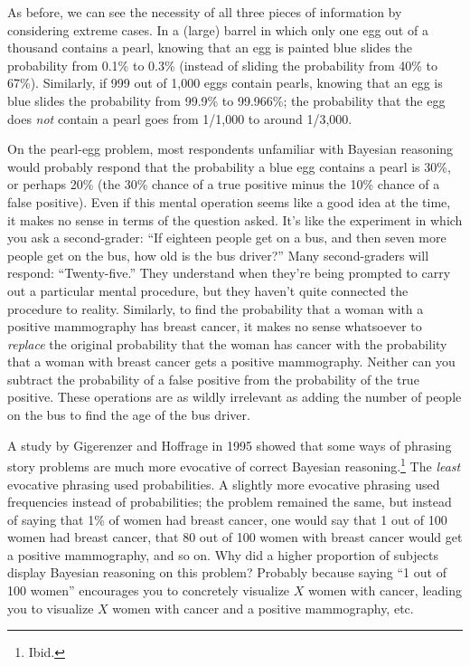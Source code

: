 {
 As before, we can see the necessity of all three pieces of
information by considering extreme cases. In a (large) barrel in which
only one egg out of a thousand contains a pearl, knowing that an egg is
painted blue slides the probability from 0.1\% to 0.3\% (instead of
sliding the probability from 40\% to 67\%). Similarly, if 999 out of
1,000 eggs contain pearls, knowing that an egg is blue slides the
probability from 99.9\% to 99.966\%; the probability that the egg does
\textit{not} contain a pearl goes from 1/1,000 to around 1/3,000.}

{
 On the pearl-egg problem, most respondents unfamiliar with
Bayesian reasoning would probably respond that the probability a blue
egg contains a pearl is 30\%, or perhaps 20\% (the 30\% chance of a
true positive minus the 10\% chance of a false positive). Even if this
mental operation seems like a good idea at the time, it makes no sense
in terms of the question asked. It's like the
experiment in which you ask a second-grader: ``If
eighteen people get on a bus, and then seven more people get on the
bus, how old is the bus driver?'' Many second-graders
will respond: ``Twenty-five.'' They
understand when they're being prompted to carry out a
particular mental procedure, but they haven't quite
connected the procedure to reality. Similarly, to find the probability
that a woman with a positive mammography has breast cancer, it makes no
sense whatsoever to \textit{replace} the original probability that the
woman has cancer with the probability that a woman with breast cancer
gets a positive mammography. Neither can you subtract the probability
of a false positive from the probability of the true positive. These
operations are as wildly irrelevant as adding the number of people on
the bus to find the age of the bus driver.}

\hr

{
 A study by Gigerenzer and Hoffrage in 1995 showed that some ways
of phrasing story problems are much more evocative of correct Bayesian
reasoning.\footnote{Ibid.} The \textit{least} evocative phrasing
used probabilities. A slightly more evocative phrasing used frequencies
instead of probabilities; the problem remained the same, but instead of
saying that 1\% of women had breast cancer, one would say that 1 out of
100 women had breast cancer, that 80 out of 100 women with breast
cancer would get a positive mammography, and so on. Why did a higher
proportion of subjects display Bayesian reasoning on this problem?
Probably because saying ``1 out of 100
women'' encourages you to concretely visualize $X$
women with cancer, leading you to visualize $X$ women with cancer and a
positive mammography, etc.}

